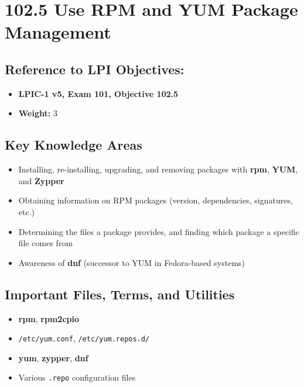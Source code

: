 \documentclass[a4paper]{report}
\begin{document}
\newpage

\section*{102.5 Use RPM and YUM Package Management}

\subsection*{Reference to LPI Objectives:}
\begin{itemize}
    \item \textbf{LPIC-1 v5, Exam 101, Objective 102.5}
    \item \textbf{Weight:} 3
\end{itemize}

\subsection*{Key Knowledge Areas}
\begin{itemize}
    \item Installing, re-installing, upgrading, and removing packages with \textbf{rpm}, \textbf{YUM}, and \textbf{Zypper}
    \item Obtaining information on RPM packages (version, dependencies, signatures, etc.)
    \item Determining the files a package provides, and finding which package a specific file comes from
    \item Awareness of \textbf{dnf} (successor to YUM in Fedora-based systems)
\end{itemize}

\subsection*{Important Files, Terms, and Utilities}
\begin{itemize}
    \item \textbf{rpm}, \textbf{rpm2cpio}
    \item \texttt{/etc/yum.conf}, \texttt{/etc/yum.repos.d/}
    \item \textbf{yum}, \textbf{zypper}, \textbf{dnf}
    \item Various \texttt{.repo} configuration files
\end{itemize}
\end{document}
